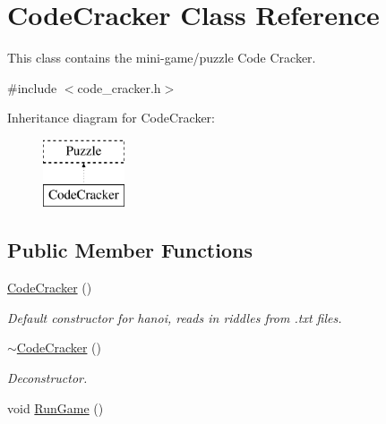 \hypertarget{classCodeCracker}{\section{Code\-Cracker Class Reference}
\label{classCodeCracker}
}


This class contains the mini-\/game/puzzle Code Cracker.  




{\ttfamily \#include $<$code\-\_\-cracker.\-h$>$}

Inheritance diagram for Code\-Cracker\-:\begin{figure}[H]
\begin{center}
\leavevmode
\includegraphics[height=2.000000cm]{classCodeCracker}
\end{center}
\end{figure}
\subsection*{Public Member Functions}
\begin{DoxyCompactItemize}
\item 
\hypertarget{classCodeCracker_a46b5ec438efd38104b9a406b45c8cd68}{\hyperlink{classCodeCracker_a46b5ec438efd38104b9a406b45c8cd68}{Code\-Cracker} ()}\label{classCodeCracker_a46b5ec438efd38104b9a406b45c8cd68}

\begin{DoxyCompactList}\small\item\em Default constructor for hanoi, reads in riddles from .txt files. \end{DoxyCompactList}\item 
\hypertarget{classCodeCracker_ae7dc389e166286ca2271625154dde39c}{\hyperlink{classCodeCracker_ae7dc389e166286ca2271625154dde39c}{$\sim$\-Code\-Cracker} ()}\label{classCodeCracker_ae7dc389e166286ca2271625154dde39c}

\begin{DoxyCompactList}\small\item\em Deconstructor. \end{DoxyCompactList}\item 
void \hyperlink{classCodeCracker_a4f2aaaf60b31cf33cc0d70622665be45}{Run\-Game} ()
\end{DoxyCompactItemize}


